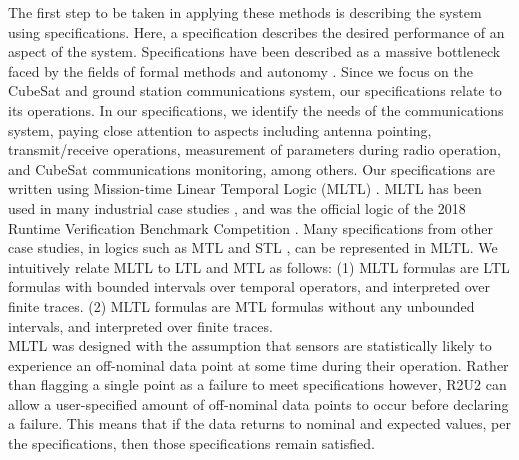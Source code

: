 \documentclass[conf]{new-aiaa}
\begin{document}
The first step to be taken in applying these methods is describing the system using specifications. Here, a specification describes the desired performance of an aspect of the system. Specifications have been described as a massive bottleneck faced by the fields of formal methods and autonomy \cite{Roz16}. Since we focus on the CubeSat and ground station communications system, our specifications relate to its operations. In our specifications, we identify the needs of the communications system, paying close attention to aspects including antenna pointing, transmit/receive operations, measurement of parameters during radio operation, and CubeSat communications monitoring, among others. Our specifications are written using Mission-time Linear Temporal Logic (MLTL) \cite{RRS14,LVR19}. MLTL has been used in many industrial case studies \cite{RRS14,GRS14,SRRMMI15,RSI15,SMR15,SMR16,MRS17}, and was the official logic of the 2018 Runtime Verification Benchmark Competition \cite{RVBC2018}. Many specifications from other case studies, in logics such as MTL \cite{AH90} and STL \cite{MN04}, can be represented in MLTL. We intuitively relate MLTL to LTL and MTL as follows: (1) MLTL formulas are LTL formulas with bounded intervals over temporal operators, and interpreted over finite traces. (2) MLTL formulas are MTL formulas without any unbounded intervals, and interpreted over finite traces.\\

MLTL was designed with the assumption that sensors are statistically likely to experience an off-nominal data point at some time during their operation. Rather than flagging a single point as a failure to meet specifications however, R2U2 can allow a user-specified amount of off-nominal data points to occur before declaring a failure. This means that if the data returns to nominal and expected values, per the specifications, then those specifications remain satisfied.
\end{document}
